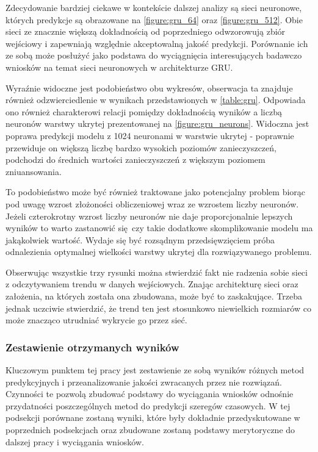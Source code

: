 \documentclass[10pt,a4paper]{article}
\begin{document}
Zdecydowanie bardziej ciekawe w kontekście dalszej analizy są sieci neuronowe, których predykcje są obrazowane na \autoref{figure:gru_64} oraz \autoref{figure:gru_512}. Obie sieci ze znacznie większą dokładnością od poprzedniego odwzorowują zbiór wejściowy i zapewniają względnie akceptowalną jakość predykcji. Porównanie ich ze sobą może posłużyć jako podstawa do wyciągnięcia interesujących badawczo wniosków na temat sieci neuronowych w architekturze GRU. 

Wyraźnie widoczne jest podobieństwo obu wykresów, obserwacja ta znajduje również odzwierciedlenie w wynikach przedstawionych w \autoref{table:gru}. Odpowiada ono również charakterowi relacji pomiędzy dokładnością wyników a liczbą neuronów warstwy ukrytej prezentowanej na \autoref{figure:gru_neurons}. Widoczna jest poprawa predykcji modelu z 1024 neuronami w warstwie ukrytej - poprawnie przewiduje on większą liczbę bardzo wysokich poziomów zanieczyszczeń, podchodzi do średnich wartości zanieczyszczeń z większym poziomem zniuansowania.

To podobieństwo może być również traktowane jako potencjalny problem biorąc pod uwagę wzrost złożoności obliczeniowej wraz ze wzrostem liczby neuronów. Jeżeli czterokrotny wzrost liczby neuronów nie daje proporcjonalnie lepszych wyników to warto zastanowić się czy takie dodatkowe skomplikowanie modelu ma jakąkolwiek wartość. Wydaje się być rozsądnym przedsięwzięciem próba odnalezienia optymalnej wielkości warstwy ukrytej dla rozwiązywanego problemu. 

Obserwując wszystkie trzy rysunki można stwierdzić fakt nie radzenia sobie sieci z odczytywaniem trendu w danych wejściowych. Znając architekturę sieci oraz założenia, na których została ona zbudowana, może być to zaskakujące. Trzeba jednak uczciwie stwierdzić, że trend ten jest stosunkowo niewielkich rozmiarów co może znacząco utrudniać wykrycie go przez sieć. 

\subsubsection{Zestawienie otrzymanych wyników}
\label{subsection:results:summary}
Kluczowym punktem tej pracy jest zestawienie ze sobą wyników różnych metod predykcyjnych i przeanalizowanie jakości zwracanych przez nie rozwiązań. Czynności te pozwolą zbudować podstawy do wyciągania wniosków odnośnie przydatności poszczególnych metod do predykcji szeregów czasowych. W tej podsekcji porównane zostaną wyniki, które były dokładnie przedyskutowane w poprzednich podsekcjach oraz zbudowane zostaną podstawy merytoryczne do dalszej pracy i wyciągania wniosków. 
\end{document}
